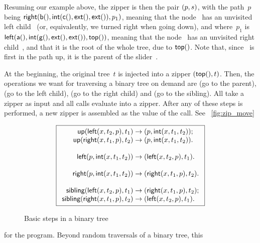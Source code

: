 Resuming our example above, the zipper is then the pair
\(({p},{s})\), with the path~\(p\) being \(\textsf{right}(\textsf{b}(),
\textsf{int}(\textsf{c}(), \textsf{ext}(), \textsf{ext}()),p_1)\), meaning that
the node ~has an unvisited left child~ (or,
equivalently, we turned right when going down), and where~\(p_1\) is
\(\textsf{left}(\textsf{a}(), \textsf{int}(\textsf{g}(), \textsf{ext}(), \textsf{ext}()),
\textsf{top}())\), meaning that the node~ has an unvisited right
child~, and that it is the root of the whole tree, due to
\(\textsf{top}()\). Note that, since ~is first in the path up, it
is the parent of the slider~.

At the beginning, the original tree~\(t\) is injected into a zipper
\(({\textsf{top}()},{t})\). Then, the operations we want for traversing
a binary tree on demand are  (go to the
parent),  (go to the left child),
 (go to the right child) and
 (go to the
sibling). All take a zipper as input and all calls evaluate into a
zipper. After any of these steps is performed, a new
zipper is assembled as the value of the
call. See \fig~\vref{fig:zip_move}
\begin{figure}
\begin{equation*}
\boxed{
\begin{array}{r@{\;}c@{\;}l}
\fun{up}(\fun{left}(x,t_2,p), t_1) & \rightarrow &
  \pair{p}{\fun{int}(x,t_1,t_2)};\\
\fun{up}(\fun{right}(x,t_1,p), t_2) & \rightarrow &
\pair{p}{\fun{int}(x,t_1,t_2)}.\\
\\
\fun{left}(p, \fun{int}(x,t_1,t_2)) & \rightarrow &
  \pair{\fun{left}(x,t_2,p)}{t_1}.\\
\\
\fun{right}(p, \fun{int}(x,t_1,t_2)) & \rightarrow &
  \pair{\fun{right}(x,t_1,p)}{t_2}.\\
\\
\fun{sibling}(\fun{left}(x,t_2,p), t_1) & \rightarrow &
  \pair{\fun{right}(x,t_1,p)}{t_2};\\
\fun{sibling}(\fun{right}(x,t_1,p), t_2) & \rightarrow &
  \pair{\fun{left}(x,t_2,p)}{t_1}.
\end{array}}
\end{equation*}
\caption{Basic steps in a binary tree}
\label{fig:zip_move}
\end{figure}
for the program. Beyond random traversals of a binary tree, this
